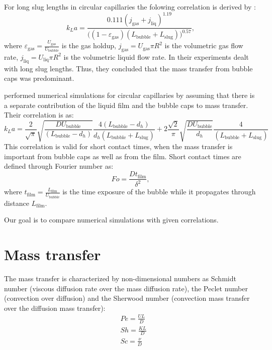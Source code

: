 \documentclass{article}
\begin{document}
For long slug lengths in circular capillaries the folowing correlation is derived by
\citet{bercic-mass}:
\begin{equation}
k_L a = \frac{0.111
(j_{\mathrm{gas}}+j_{\mathrm{liq}})^{1.19}}{\bigl((1-\varepsilon_{\mathrm{gas}})(L_{\mathrm{bubble}}
+L_ {\mathrm{slug}} )\bigr)^{0.57} },
\end{equation}
where $\varepsilon_{\mathrm{gas}}=\frac{U_{\mathrm{gas}}}{U_{\mathrm{bubble}}}$ is the gas holdup,
$j_{\mathrm{gas}}=U_{\mathrm{gas}} \pi R^2$ is the volumetric gas flow rate,
$j_{\mathrm{liq}}=U_{\mathrm{liq}} \pi R^2$ is the volumetric liquid flow rate. In their
experiments \citeauthor{bercic-mass} dealt with long slug lengths. Thus, they concluded that the
mass transfer from bubble caps was predominant.

\citet{vanbaten-circular} performed numerical simulations for circular capillaries by assuming that
there is a separate contribution of the liquid film and the bubble caps to mass transfer. Their
correlation is as:
\begin{equation}
k_L a = \frac{2}{\sqrt{\pi}}\sqrt{\frac{D U_{\mathrm{bubble}}}{(L_{\mathrm{bubble}}-d_h)}}
\frac{4(L_{\mathrm{bubble}}-d_h)}{d_h(L_{\mathrm{bubble}}+L_{\mathrm{slug}})}+2\frac{\sqrt{2}}{\pi}
 \sqrt{\frac{D U_{\mathrm{bubble}}}{d_h}} \frac{4}{(L_{\mathrm{bubble}}+L_{\mathrm{slug}})}
\end{equation}
This correlation is valid for short contact times, when the mass transfer is important from bubble
caps as well as from the film. Short contact times are defined through Fourier number as:
\begin{equation}
Fo=\frac{D t_{\mathrm{film}}}{\delta^2},
\end{equation}
where $t_{\mathrm{film}}=\frac{L_{\mathrm{film}}}{U_{\mathrm{bubble}}}$ is the time exposure of the
bubble while it propagates through distance $L_{\mathrm{film}}$. 

Our goal is to compare numerical simulations with given correlations.

\section{Mass transfer}
The mass transfer is characterized by non-dimensional numbers as Schmidt number (viscous diffusion
rate over the mass diffusion rate), the Peclet number (convection over diffusion) and the Sherwood
number (convection mass transfer over the diffusion mass transfer):
\begin{equation}
\begin{aligned}
&Pe=\frac{U L}{D}\\
&Sh=\frac{K L}{D}\\
&Sc=\frac{\nu}{D}\\
\end{aligned}
\end{equation}
\end{document}
